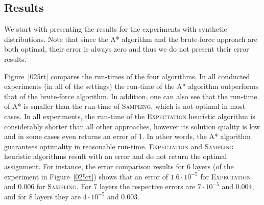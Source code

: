 \documentclass[letterpaper]{article}
\newcommand{\astar}{\textsc{A*}\xspace}
\newcommand{\sampling}{\textsc{Sampling}\xspace}
\newcommand{\expectation}{\textsc{Expectation}\xspace}
\begin{document}
\subsection{Results}
\label{sec:res}

We start with presenting the results for the experiments with synthetic distributions. Note that since the \astar algorithm and the brute-force approach are both optimal, their error is always zero and thus we do not present their error results.

Figure~\ref{025rt} compares the run-times of the four algorithms.
In all conducted experiments (in all of the settings) the run-time of the \astar algorithm outperforms that of the brute-force algorithm. In addition, one can also see that the run-time of \astar is smaller than the run-time of \sampling, which is not optimal in most cases. In all experiments, the run-time of the \expectation heuristic algorithm is considerably shorter than all other approaches, however its solution quality is low and in some cases even returns an error of 1.
In other words, the \astar algorithm guarantees optimality in reasonable run-time. \expectation and \sampling heuristic algorithms result with an error and do not return the optimal assignment.
For instance, the error comparison results for 6 layers (of the experiment in Figure~\ref{025rt}) shows that an error of $1.6\cdot 10^{-5}$ for \expectation and $0.006$ for \sampling. For 7 layers the respective errors are $7 \cdot 10^{-5}$ and $0.004$, and for 8 layers they are $4 \cdot 10^{-5}$ and $0.003$. %
\end{document}
